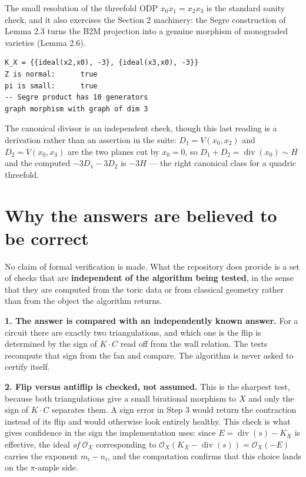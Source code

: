 \documentclass[11pt,reqno]{amsart}
\newcommand{\sO}{\ensuremath{\mathcal{O}}}
\DeclareMathOperator{\divisor}{div}
\theoremstyle{plain}
\theoremstyle{definition}
\begin{document}
The small resolution of the threefold ODP \(x_0x_1 = x_2x_3\) is the
standard sanity check, and it also exercises the Section 2 machinery:
the Segre construction of Lemma 2.3 turns the B2M projection into a
genuine morphism of monograded varieties (Lemma 2.6).

\begin{verbatim}
K_X = {{ideal(x2,x0), -3}, {ideal(x3,x0), -3}}
Z is normal:      true
pi is small:      true
-- Segre product has 10 generators
graph morphism with graph of dim 3
\end{verbatim}

The canonical divisor is an independent check, though this last reading
is a derivation rather than an assertion in the suite:
\(D_1 = V(x_0,x_2)\) and \(D_2 = V(x_0,x_3)\) are the two planes cut by
\(x_0 = 0\), so \(D_1 + D_2 = \divisor(x_0) \sim H\) and the
computed \(-3D_1 - 3D_2\) is \(-3H\) --- the right canonical class for a
quadric threefold.

\section{Why the answers are believed to be
correct}\label{why-the-answers-are-believed-to-be-correct}

No claim of formal verification is made. What the repository does
provide is a set of checks that are \textbf{independent of the algorithm
being tested}, in the sense that they are computed from the toric data
or from classical geometry rather than from the object the algorithm
returns.

\textbf{1. The answer is compared with an independently known answer.}
For a circuit there are exactly two triangulations, and which one is the
flip is determined by the sign of \(K \cdot C\) read off from the wall
relation. The tests recompute that sign from the fan and compare. The
algorithm is never asked to certify itself.

\textbf{2. Flip versus antiflip is checked, not assumed.} This is the
sharpest test, because both triangulations give a small birational
morphism to \(X\) and only the sign of \(K \cdot C\) separates them. A
sign error in Step 3 would return the contraction instead of its flip
and would otherwise look entirely healthy. This check is what gives
confidence in the sign the implementation uses: since
\(E = \divisor(s) - K_X\) is effective, the ideal \emph{of} \(\sO_X\)
corresponding to \(\sO_X(K_X - \divisor(s)) = \sO_X(-E)\) carries the
exponent \(m_i - n_i\), and the computation confirms that this choice
lands on the \(\pi\)-ample side.
\end{document}
